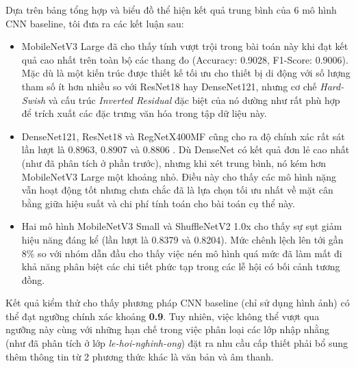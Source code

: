 \indent Dựa trên bảng tổng hợp và biểu đồ thể hiện kết quả trung bình của 6 mô hình CNN baseline, tôi đưa ra các kết luận sau:\vspace{-0.1cm}
\begin{itemize}[label={--}, itemsep=1pt]
    \item MobileNetV3 Large đã cho thấy tính vượt trội trong bài toán này khi đạt kết quả cao nhất trên toàn bộ các thang đo (Accuracy: 0.9028, F1-Score: 0.9006). Mặc dù là một kiến trúc được thiết kế tối ưu cho thiết bị di động với số lượng tham số ít hơn nhiều so với ResNet18 hay DenseNet121, nhưng cơ chế \textit{Hard-Swish} và cấu trúc \textit{Inverted Residual} đặc biệt của nó dường như rất phù hợp để trích xuất các đặc trưng văn hóa trong tập dữ liệu này. 

    \item DenseNet121, ResNet18 và RegNetX400MF cũng cho ra độ chính xác rất sát lần lượt là 0.8963, 0.8907 và 0.8806 . Dù DenseNet có kết quả đơn lẻ cao nhất (như đã phân tích ở phần trước), nhưng khi xét trung bình, nó kém hơn MobileNetV3 Large một khoảng nhỏ. Điều này cho thấy các mô hình nặng vẫn hoạt động tốt nhưng chưa chắc đã là lựa chọn tối ưu nhất về mặt cân bằng giữa hiệu suất và chi phí tính toán cho bài toán cụ thể này.

    \item Hai mô hình MobileNetV3 Small và ShuffleNetV2 1.0x cho thấy sự sụt giảm hiệu năng đáng kể (lần lượt là 0.8379 và 0.8204). Mức chênh lệch lên tới gần 8\% so với nhóm dẫn đầu cho thấy việc nén mô hình quá mức đã làm mất đi khả năng phân biệt các chi tiết phức tạp trong các lễ hội có bối cảnh tương đồng.
\end{itemize}

Kết quả kiểm thử cho thấy phương pháp CNN baseline (chỉ sử dụng hình ảnh) có thể đạt ngưỡng chính xác khoảng \textbf{0.9}. Tuy nhiên, việc không thể vượt qua ngưỡng này cùng với những hạn chế trong việc phân loại các lớp nhập nhằng (như đã phân tích ở lớp \textit{le-hoi-nghinh-ong}) đặt ra nhu cầu cấp thiết phải bổ sung thêm thông tin từ 2 phương thức khác là văn bản và âm thanh.